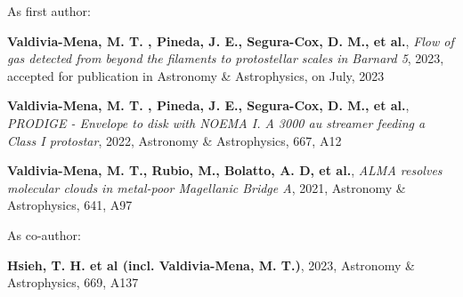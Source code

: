 \vspace{8pt}

As first author:
\vspace{4pt}
\begin{cvitems} %
	 \item{\textbf{Valdivia-Mena, M. T. , Pineda, J. E., Segura-Cox, D. M., et al.}, \textit{Flow of gas detected from beyond the filaments to protostellar scales in Barnard 5}, 2023, accepted for publication in Astronomy \& Astrophysics, on July, 2023}
      \item{\textbf{Valdivia-Mena, M. T. , Pineda, J. E., Segura-Cox, D. M., et al.}, \textit{PRODIGE - Envelope to disk with NOEMA I. A 3000 au streamer feeding a Class I protostar}, 2022, Astronomy \& Astrophysics, 667, A12}
      \item{\textbf{Valdivia-Mena, M. T., Rubio, M., Bolatto, A. D, et al.}, \textit{ALMA resolves molecular clouds in metal-poor Magellanic Bridge A}, 2021, Astronomy \& Astrophysics, 641, A97}
\end{cvitems}
\vspace{4pt}
As co-author:
\vspace{4pt}
\begin{cvitems} %
	\item{{\textbf{Hsieh, T. H. et al (incl. Valdivia-Mena, M. T.)}, 2023, Astronomy \& Astrophysics, 669, A137}}

\end{cvitems}
\vspace{8pt}
